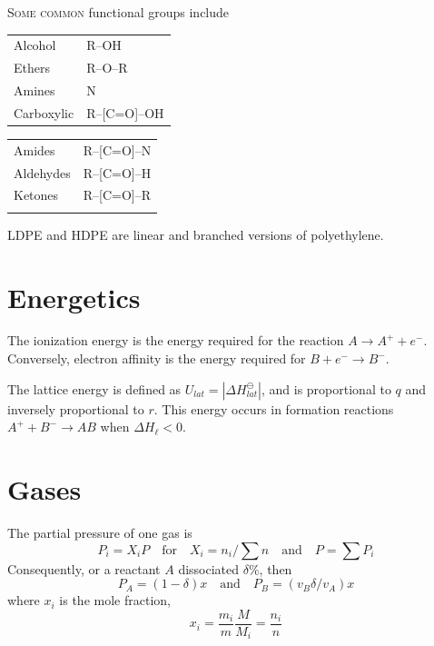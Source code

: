 \documentclass{tufte-book}
\begin{document}
\textsc{Some common} functional groups include
%
\begin{center}
  \begin{tabular}{ll}
    Alcohol & R--OH \\
    Ethers & R--O--R \\
    Amines & N \\
    Carboxylic & R--[C=O]--OH
  \end{tabular} \qquad\qquad
  \begin{tabular}{ll}
    Amides & R--[C=O]--N \\
    Aldehydes & R--[C=O]--H \\
    Ketones & R--[C=O]--R \\
    \phantom{K}
  \end{tabular}
\end{center}
%
LDPE and HDPE are linear and branched versions of polyethylene.

\section{Energetics}
The ionization energy is the energy required for the reaction $A \to A^+ + e^-$. Conversely, electron affinity is the energy required for $B + e^- \to B^-$.

\bigskip
The lattice energy is defined as $U_{lat} = |\Delta H^\ominus_{lat}|$, and is proportional to $q$ and inversely proportional to $r$. This energy occurs in formation reactions $A^+ + B^- \to AB$ when $\Delta H_\ell < 0$.

\section{Gases}

The partial pressure of one gas is \begin{equation}
  P_i = X_i P \quad\text{for}\quad X_i = n_i/\sum n \quad\text{and}\quad P = \sum P_i
\end{equation}
Consequently, or a reactant $A$ dissociated $\delta \%$, then \begin{equation}
  P_A = (1- \delta)x \quad\text{and}\quad P_B = (v_B \delta / v_A)x
\end{equation}
where $x_i$ is the mole fraction, \begin{equation}
  x_i = \frac{m_i}{m} \frac{M}{M_i} = \frac{n_i}{n}
\end{equation}
\end{document}
